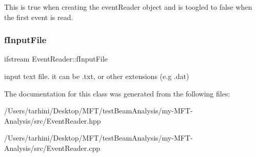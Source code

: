 This is true when creating the event\+Reader object and is toogled to false when the first event is read. \mbox{\label{class_event_reader_aaec259fd474a164d259caf942bbca0c4}} 
\subsubsection{\texorpdfstring{f\+Input\+File}{fInputFile}}
{\footnotesize\ttfamily ifstream Event\+Reader\+::f\+Input\+File\hspace{0.3cm}{\ttfamily [private]}}

input text file. it can be .txt, or other extensions (e.\+g .dat) 

The documentation for this class was generated from the following files\+:\begin{DoxyCompactItemize}
\item 
/\+Users/tarhini/\+Desktop/\+M\+F\+T/test\+Beam\+Analysis/my-\/\+M\+F\+T-\/\+Analysis/src/Event\+Reader.\+hpp\item 
/\+Users/tarhini/\+Desktop/\+M\+F\+T/test\+Beam\+Analysis/my-\/\+M\+F\+T-\/\+Analysis/src/Event\+Reader.\+cpp\end{DoxyCompactItemize}
